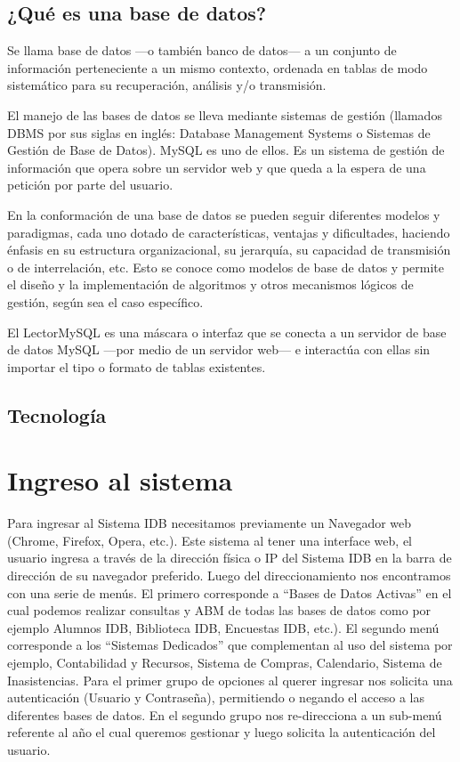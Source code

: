 \documentclass[a4paper,10pt]{article}
\begin{document}
\subsection{¿Qué es una base de datos?}
Se llama base de datos ---o también banco de datos--- a un conjunto de información 
perteneciente a un mismo contexto, ordenada en tablas de modo sistemático para su 
recuperación, análisis y/o transmisión.

El manejo de las bases de datos se lleva mediante sistemas de gestión (llamados 
DBMS por sus siglas en inglés: Database Management Systems o Sistemas de Gestión 
de Base de Datos). MySQL es uno de ellos. Es un sistema de gestión de información que opera 
sobre un servidor web y que queda a la espera de una petición por parte del usuario.

En la conformación de una base de datos se pueden seguir diferentes modelos y 
paradigmas, cada uno dotado de características, ventajas y dificultades, 
haciendo énfasis en su estructura organizacional, su jerarquía, su capacidad de 
transmisión o de interrelación, etc. Esto se conoce como modelos de base de 
datos y permite el diseño y la implementación de algoritmos y otros mecanismos 
lógicos de gestión, según sea el caso específico.

El LectorMySQL es una máscara o interfaz que se conecta a un servidor de base de datos MySQL ---por medio de un servidor web---
 e interactúa con ellas sin importar el tipo o formato de tablas existentes.

\subsection{Tecnología}

\section{Ingreso al sistema}
Para ingresar al Sistema IDB necesitamos previamente un Navegador web (Chrome, Firefox, Opera, etc.). Este sistema al tener una interface web, el usuario ingresa a través de la dirección física o IP del Sistema IDB en la barra de dirección de su navegador preferido. Luego del direccionamiento nos encontramos con una serie de menús. El primero corresponde a “Bases de Datos Activas” en el cual podemos realizar consultas y ABM de todas las bases de datos como por ejemplo Alumnos IDB, Biblioteca IDB, Encuestas IDB, etc.). El segundo menú corresponde a los “Sistemas Dedicados” que complementan al uso del sistema por ejemplo, Contabilidad y Recursos, Sistema de Compras, Calendario, Sistema de Inasistencias.
Para el primer grupo de opciones al querer ingresar nos solicita una autenticación (Usuario y Contraseña), permitiendo o negando el acceso a las diferentes bases de datos. 
En el segundo grupo nos re-direcciona a un sub-menú referente al año el cual queremos gestionar y luego solicita la autenticación del usuario. 
 
\end{document}
